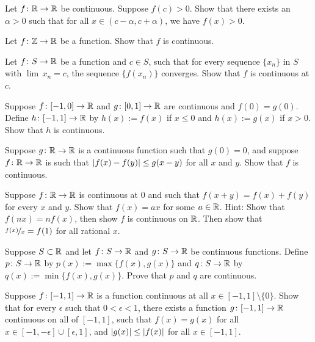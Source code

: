 \begin{exercise} \label{exercise:positivecontneigh}
Let $f \colon {\mathbb{R}} \to {\mathbb{R}}$ be continuous.  Suppose $f(c) > 0$.  Show that
there exists an $\alpha > 0$ such that for all $x \in (c-\alpha,c+\alpha)$,
we have $f(x) > 0$.
\end{exercise}

\begin{exercise}
Let $f \colon {\mathbb{Z}} \to {\mathbb{R}}$ be a function.  Show that $f$ is continuous.
\end{exercise}

\begin{exercise} \label{exercise:contseqalt}
Let $f \colon S \to {\mathbb{R}}$ be a function and $c \in S$, such that for every
sequence $\{ x_n \}$ in $S$ with $\lim\, x_n = c$, the sequence
$\{ f(x_n) \}$ converges.  Show that $f$ is continuous at $c$.
\end{exercise}

\begin{exercise}
Suppose $f \colon [-1,0] \to {\mathbb{R}}$ and $g \colon [0,1] \to {\mathbb{R}}$ are continuous
and $f(0) = g(0)$.  Define $h \colon [-1,1] \to {\mathbb{R}}$ by 
$h(x) := f(x)$ if $x \leq 0$ and $h(x) := g(x)$ if $x > 0$.  Show that
$h$ is continuous.
\end{exercise}

\begin{exercise}
Suppose $g \colon {\mathbb{R}} \to {\mathbb{R}}$ is a continuous function such that $g(0) = 0$,
and suppose $f \colon {\mathbb{R}} \to {\mathbb{R}}$ is such that
$\left\lvert {f(x)-f(y)} \right\rvert \leq g(x-y)$ for all $x$ and $y$.  Show that $f$ is
continuous.
\end{exercise}

\begin{exercise}[Challenging]
Suppose $f \colon {\mathbb{R}} \to {\mathbb{R}}$ is continuous at $0$ and
such that $f(x+y) = f(x) + f(y)$ for every $x$ and $y$.
Show that $f(x) = ax$ for some $a \in {\mathbb{R}}$.
Hint: Show that $f(nx) = nf(x)$, then show $f$ is continuous on ${\mathbb{R}}$.
Then show that $\nicefrac{f(x)}{x} = f(1)$ for all rational $x$.
\end{exercise}

\begin{exercise} \label{exercise:minmaxcont}
Suppose $S \subset {\mathbb{R}}$ and
let $f \colon S \to {\mathbb{R}}$ and
$g \colon S \to {\mathbb{R}}$ be continuous functions.
Define $p \colon S \to {\mathbb{R}}$ by
$p(x) := \max \{ f(x) , g(x) \}$ and
$q \colon S \to {\mathbb{R}}$ by
$q(x) := \min \{ f(x) , g(x) \}$.  Prove that $p$ and $q$ are
continuous.
\end{exercise}

\begin{exercise}
Suppose $f \colon [-1,1] \to {\mathbb{R}}$ is a function continuous at all $x \in
[-1,1] \setminus \{ 0 \}$.  Show that for every $\epsilon$ such
that $0 < \epsilon < 1$, there exists
a function $g \colon [-1,1] \to {\mathbb{R}}$ continuous on all of $[-1,1]$, such that
$f(x) = g(x)$ for all $x \in [-1,-\epsilon] \cup [\epsilon,1]$, and 
$\left\lvert {g(x)} \right\rvert \leq \left\lvert {f(x)} \right\rvert$ for all $x \in [-1,1]$.
\end{exercise}

